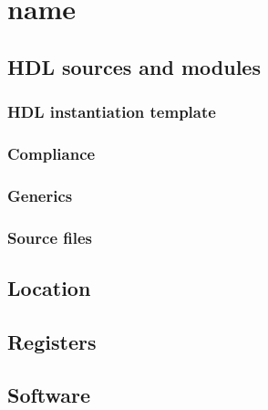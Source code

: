 \section{name}
\subsection{HDL sources and modules}
\subsubsection{HDL instantiation template}
\subsubsection{Compliance}
\subsubsection{Generics}
\subsubsection{Source files}
\subsection{Location}
\subsection{Registers}
\subsection{Software}
